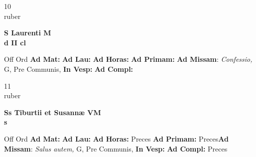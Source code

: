 \documentclass[10pt, openany]{book}
\begin{document}
    \begin{center}
        \begin{minipage}{3.5in}
            \vspace{2em}
            \begin{minipage}{0.5in}
                {\Huge 10} \\
                {\normalsize ruber}
            \end{minipage}
            \begin{minipage}{3.0in}
                \textbf{ \large S Laurenti M \\
                \textnormal{\normalsize d II cl}}

            \end{minipage}
            \begin{justify}Off Ord
                \textbf{Ad Mat: }
                \textbf{Ad Lau: }
                \textbf{Ad Horas: }
                \textbf{Ad Primam: }\textbf{Ad Missam}: \textit{Confessio,} G, Pre Communis, 
                \textbf{In Vesp: }
                \textbf{Ad Compl: }
            \end{justify}
        \end{minipage}
    \end{center}

    \begin{center}
        \begin{minipage}{3.5in}
            \vspace{2em}
            \begin{minipage}{0.5in}
                {\Huge 11} \\
                {\normalsize ruber}
            \end{minipage}
            \begin{minipage}{3.0in}
                \textbf{ \large Ss Tiburtii et Susannæ VM \\
                \textnormal{\normalsize s}}

            \end{minipage}
            \begin{justify}Off Ord
                \textbf{Ad Mat: }
                \textbf{Ad Lau: }
                \textbf{Ad Horas: }Preces
                \textbf{Ad Primam: }Preces\textbf{Ad Missam}: \textit{Salus autem,} G, Pre Communis, 
                \textbf{In Vesp: }
                \textbf{Ad Compl: }Preces
            \end{justify}
        \end{minipage}
    \end{center}
\end{document}
